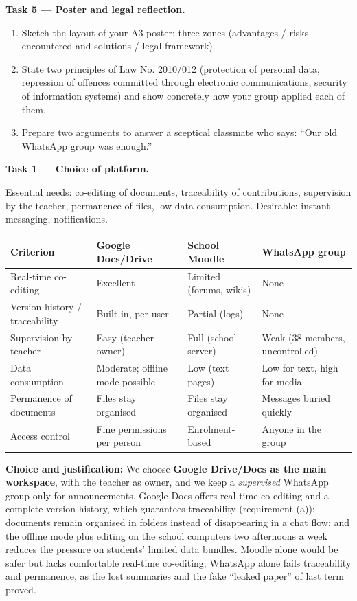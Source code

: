 \documentclass[11pt]{article}
\newcounter{popsec}
\newcounter{popsub}
\newcommand{\courssub}[1]{%
  \stepcounter{popsub}%
  \par\vspace{9pt}\noindent{\popxbold\fontsize{11.5}{13}\selectfont\color{popink}{\color{poporange}\thepopsec.\thepopsub}\hspace{6pt}#1}\par\nopagebreak\vspace{4pt}
}
\begin{document}
\textbf{Task 5 — Poster and legal reflection.}
\begin{enumerate}
\item Sketch the layout of your A3 poster: three zones (advantages / risks encountered and solutions / legal framework).
\item State two principles of Law No. 2010/012 (protection of personal data, repression of offences committed through electronic communications, security of information systems) and show concretely how your group applied each of them.
\item Prepare two arguments to answer a sceptical classmate who says: ``Our old WhatsApp group was enough.''
\end{enumerate}

\courssub{Model answer}

\textbf{Task 1 — Choice of platform.}\par
Essential needs: co-editing of documents, traceability of contributions, supervision by the teacher, permanence of files, low data consumption. Desirable: instant messaging, notifications.

\begin{center}
\begin{tabularx}{\linewidth}{|l|X|X|X|}
\hline
\rowcolor{popblueL} \textbf{Criterion} & \textbf{Google Docs/Drive} & \textbf{School Moodle} & \textbf{WhatsApp group} \\
\hline
Real-time co-editing & Excellent & Limited (forums, wikis) & None \\
\hline
Version history / traceability & Built-in, per user & Partial (logs) & None \\
\hline
Supervision by teacher & Easy (teacher owner) & Full (school server) & Weak (38 members, uncontrolled) \\
\hline
Data consumption & Moderate; offline mode possible & Low (text pages) & Low for text, high for media \\
\hline
Permanence of documents & Files stay organised & Files stay organised & Messages buried quickly \\
\hline
Access control & Fine permissions per person & Enrolment-based & Anyone in the group \\
\hline
\end{tabularx}
\end{center}

\textbf{Choice and justification:} We choose \textbf{Google Drive/Docs as the main workspace}, with the teacher as owner, and we keep a \emph{supervised} WhatsApp group only for announcements. Google Docs offers real-time co-editing and a complete version history, which guarantees traceability (requirement (a)); documents remain organised in folders instead of disappearing in a chat flow; and the offline mode plus editing on the school computers two afternoons a week reduces the pressure on students' limited data bundles. Moodle alone would be safer but lacks comfortable real-time co-editing; WhatsApp alone fails traceability and permanence, as the lost summaries and the fake ``leaked paper'' of last term proved.
\end{document}
